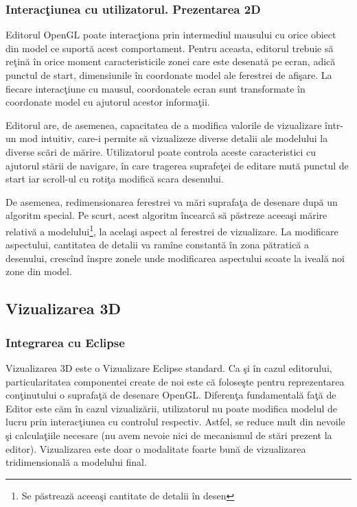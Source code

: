 \subsubsection{Interacţiunea cu utilizatorul. Prezentarea 2D}
Editorul OpenGL poate interacţiona prin intermediul mausului cu orice obiect din
model ce suportă acest comportament. Pentru aceasta, editorul trebuie să reţină
în orice moment caracteristicile zonei care este desenată pe ecran, adică
punctul de start, dimensiunile în coordonate model ale ferestrei de afişare. La
fiecare interacţiune cu mausul, coordonatele ecran sunt transformate în
coordonate model cu ajutorul acestor informaţii.

Editorul are, de asemenea, capacitatea de a modifica valorile de vizualizare
într-un mod intuitiv, care-i permite să vizualizeze diverse detalii ale
modelului la diverse scări de mărire. Utilizatorul poate controla aceste
caracteristici cu ajutorul stării de navigare, în care tragerea suprafeţei de
editare mută punctul de start iar scroll-ul cu rotiţa modifică scara desenului.

De asemenea, redimensionarea ferestrei va mări suprafaţa de desenare după un
algoritm special. Pe scurt, acest algoritm încearcă să păstreze aceeaşi mărire
relativă a modelului\footnote{Se păstrează aceeaşi cantitate de detalii în
desen}, la acelaşi aspect al ferestrei de vizualizare. La modificare aspectului,
cantitatea de detalii va ramîne constantă în zona pătratică a desenului,
crescînd înspre zonele unde modificarea aspectului scoate la iveală noi zone din
model.

\subsection{Vizualizarea 3D}
\label{section:impl-view}

\subsubsection{Integrarea cu Eclipse}
Vizualizarea 3D este o Vizualizare Eclipse standard. Ca şi în cazul editorului,
particularitatea componentei create de noi este că foloseşte pentru
reprezentarea conţinutului o suprafaţă de desenare OpenGL. Diferenţa
fundamentală faţă de Editor este căm în cazul vizualizării, utilizatorul nu
poate modifica modelul de lucru prin interacţiunea cu controlul respectiv.
Astfel, se reduce mult din nevoile şi calculaţiile necesare (nu avem nevoie nici
de mecanismul de stări prezent la editor). Vizualizarea este doar o modalitate
foarte bună de vizualizarea tridimensională a modelului final.

